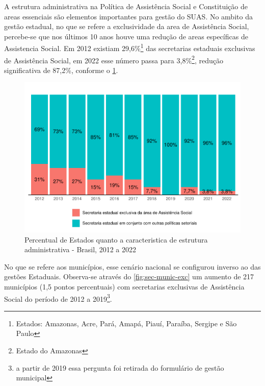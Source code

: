 \documentclass[
  brazilian]{report}
\begin{document}
A estrutura administrativa na Política de Assistência Social e
Constituição de areas essenciais são elementos importantes para gestão
do SUAS. No ambito da gestão estadual, no que se refere a exclusividade
da area de Assistência Social, percebe-se que nos últimos 10 anos houve
uma redução de areas específicas de Assistencia Social. Em 2012 existiam
29,6\%\footnote{Estados: Amazonas, Acre, Pará, Amapá, Piauí, Paraíba, Sergipe e São Paulo}
das secretarias estaduais exclusivas de Assistência Social, em 2022 esse
número passa para 3,8\%\footnote{Estado do Amazonas}, redução
significativa de 87,2\%, conforme o \cref{fig:estados_sec_exc}.

\begin{figure}
\includegraphics{Censo-SUAS-2022_files/figure-latex/estados_sec_exc-1} \caption[Percentual de Estados quanto a caracteristica de estrutura administrativa - Brasil, 2012 a 2022]{Percentual de Estados quanto a caracteristica de estrutura administrativa - Brasil, 2012 a 2022}\label{fig:estados_sec_exc}
\end{figure}

No que se refere aos municípios, esse cenário nacional se configurou
inverso ao das gestões Estaduais. Observa-se através do
\cref{fig:sec-munic-exc} um aumento de 217 municípios (1,5 pontos
percentuais) com secretarias exclusivas de Assistência Social do período
de 2012 a
2019\footnote{a partir de 2019 essa pergunta foi retirada do formulário de gestão municipal}.
\end{document}

